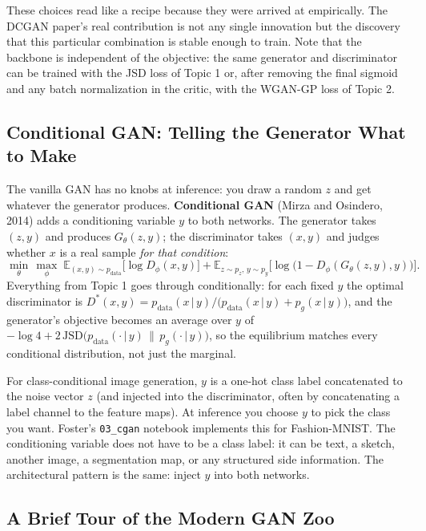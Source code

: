 \documentclass[11pt]{article}
\newcommand{\E}{\mathbb{E}}
\newcommand{\given}{\,\vert\,}
\theoremstyle{remark}
\begin{document}
These choices read like a recipe because they were arrived at empirically. The DCGAN paper's real contribution is not any single innovation but the discovery that this particular combination is stable enough to train. Note that the backbone is independent of the objective: the same generator and discriminator can be trained with the JSD loss of Topic 1 or, after removing the final sigmoid and any batch normalization in the critic, with the WGAN-GP loss of Topic 2.

\subsection{Conditional GAN: Telling the Generator What to Make}

The vanilla GAN has no knobs at inference: you draw a random $z$ and get whatever the generator produces. \textbf{Conditional GAN} (Mirza and Osindero, 2014) adds a conditioning variable $y$ to both networks. The generator takes $(z,y)$ and produces $G_\theta(z,y)$; the discriminator takes $(x,y)$ and judges whether $x$ is a real sample \emph{for that condition}:
\begin{equation}
\min_\theta\, \max_\phi\;
\E_{(x,y)\sim p_{\text{data}}}\!\big[\log D_\phi(x,y)\big]
+ \E_{z\sim p_z,\, y\sim p_y}\!\big[\log\big(1-D_\phi(G_\theta(z,y),y)\big)\big].
\label{eq:cgan}
\end{equation}
Everything from Topic 1 goes through conditionally: for each fixed $y$ the optimal discriminator is $D^*(x,y)=p_{\text{data}}(x\given y)/\big(p_{\text{data}}(x\given y)+p_g(x\given y)\big)$, and the generator's objective becomes an average over $y$ of $-\log 4 + 2\,\mathrm{JSD}\big(p_{\text{data}}(\cdot\given y)\,\|\,p_g(\cdot\given y)\big)$, so the equilibrium matches every conditional distribution, not just the marginal.

For class-conditional image generation, $y$ is a one-hot class label concatenated to the noise vector $z$ (and injected into the discriminator, often by concatenating a label channel to the feature maps). At inference you choose $y$ to pick the class you want. Foster's \texttt{03\_cgan} notebook implements this for Fashion-MNIST. The conditioning variable does not have to be a class label: it can be text, a sketch, another image, a segmentation map, or any structured side information. The architectural pattern is the same: inject $y$ into both networks.

\subsection{A Brief Tour of the Modern GAN Zoo}
\end{document}
